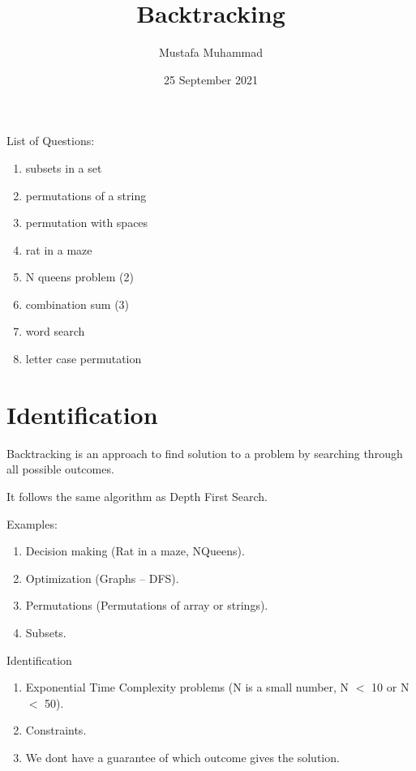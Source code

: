 \documentclass[a4]{article}
\title{Backtracking}
\author{Mustafa Muhammad}
\date{25 September 2021}
\begin{document}
\maketitle

\newpage

List of Questions:
\begin{enumerate}
	\item subsets in a set
	\item permutations of a string
	\item permutation with spaces
	\item rat in a maze
	\item N queens problem (2)
	\item combination sum (3)
	\item word search 
	\item letter case permutation
\end{enumerate}

\newpage

\section{Identification}

Backtracking is an approach to find solution to a problem by searching through all possible outcomes.

It follows the same algorithm as Depth First Search.

Examples:
\begin{enumerate}
    \item Decision making (Rat in a maze, NQueens).
    \item Optimization (Graphs -- DFS).
    \item Permutations (Permutations of array or strings).
    \item Subsets.
\end{enumerate}

Identification
\begin{enumerate}
    \item Exponential Time Complexity problems (N is a small number, N $<$ 10 or N $<$ 50).
    \item Constraints.
    \item We dont have a guarantee of which outcome gives the solution.
\end{enumerate}

\newpage
\end{document}

